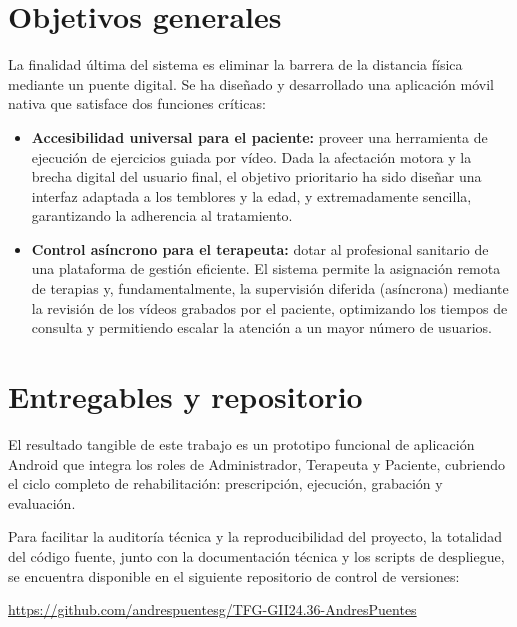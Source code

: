 \section{Objetivos generales}

La finalidad última del sistema es eliminar la barrera de la distancia física mediante un puente digital. Se ha diseñado y desarrollado una aplicación móvil nativa que satisface dos funciones críticas:

\begin{itemize}
    \item \textbf{Accesibilidad universal para el paciente:} proveer una herramienta de ejecución de ejercicios guiada por vídeo. Dada la afectación motora y la brecha digital del usuario final, el objetivo prioritario ha sido diseñar una interfaz adaptada a los temblores y la edad, y extremadamente sencilla, garantizando la adherencia al tratamiento.
    
    \item \textbf{Control asíncrono para el terapeuta:} dotar al profesional sanitario de una plataforma de gestión eficiente. El sistema permite la asignación remota de terapias y, fundamentalmente, la supervisión diferida (asíncrona) mediante la revisión de los vídeos grabados por el paciente, optimizando los tiempos de consulta y permitiendo escalar la atención a un mayor número de usuarios.
\end{itemize}

\section{Entregables y repositorio}

El resultado tangible de este trabajo es un prototipo funcional de aplicación Android que integra los roles de Administrador, Terapeuta y Paciente, cubriendo el ciclo completo de rehabilitación: prescripción, ejecución, grabación y evaluación.

Para facilitar la auditoría técnica y la reproducibilidad del proyecto, la totalidad del código fuente, junto con la documentación técnica y los scripts de despliegue, se encuentra disponible en el siguiente repositorio de control de versiones:

\begin{center}
    \url{https://github.com/andrespuentesg/TFG-GII24.36-AndresPuentes}
\end{center}